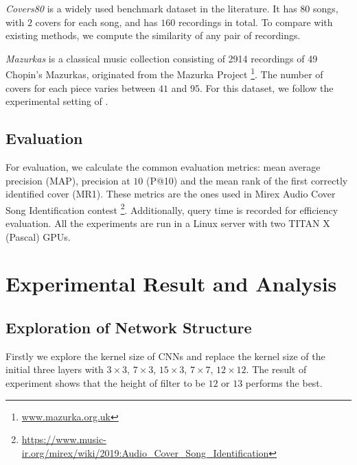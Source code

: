 \documentclass{article}
\begin{document}
\textit{Covers80} is a widely used benchmark dataset in the literature. It has $80$ songs, with $2$ covers for each song, and has $160$ recordings in total. To compare with existing methods, we compute the similarity of any pair of recordings.

\textit{Mazurkas} is a classical music collection consisting of 2914 recordings of 49 Chopin's Mazurkas, originated from the Mazurka Project \footnote{\url{www.mazurka.org.uk}}. The number of covers for each piece varies between $41$ and $95$. For this dataset, we follow the experimental setting of \cite{silva2016simple}.

\subsection{Evaluation}
For evaluation, we calculate the common evaluation metrics: mean average precision (MAP), precision at $10$ (P@10) and the mean rank of the first correctly identified cover (MR1). These metrics are the ones used in Mirex Audio Cover Song Identification contest \footnote{\url{https://www.music-ir.org/mirex/wiki/2019:Audio_Cover_Song_Identification}}. Additionally, query time is recorded for efficiency evaluation. All the experiments are run in a Linux server with two TITAN X (Pascal) GPUs.

\section{Experimental Result and Analysis}
\subsection{Exploration of Network Structure}
\label{subsec:expl}
Firstly we explore the kernel size of CNNs and replace the kernel size of the initial three layers with {$3\times3$}, {$7\times3$}, {$15\times3$}, {$7\times7$}, {$12\times12$}. The result of experiment shows that the height of filter to be $12$ or $13$ performs the best.
\end{document}
